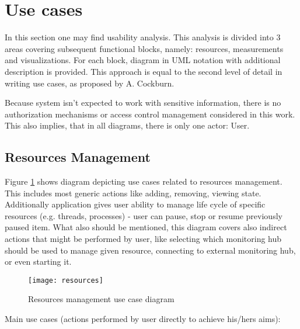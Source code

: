 %


\section{Use cases}
\label{sec:ch4_usecases}

In this section one may find usability analysis. This analysis is divided into 3 areas covering subsequent functional
blocks, namely: resources, measurements and visualizations. For each block, diagram in UML notation with additional
description is provided. This approach is equal to the second level of detail in writing use cases, as proposed by A.
Cockburn\cite{0201702258}. 

Because system isn't expected to work with sensitive information, there is no authorization mechanisms or access
control management considered in this work. This also implies, that in all diagrams, there is only one actor: User.

\pagebreak

\subsection{Resources Management}
\label{subsec:resources_mgmnt}

Figure \ref{fig:usecase_resources} shows diagram depicting use cases related to resources management. This includes most
generic actions like adding, removing, viewing state. Additionally application gives user ability to manage life cycle
of specific resources (e.g. threads, processes) - user can pause, stop or resume previously paused item. What also
should be mentioned, this diagram covers also indirect actions that might be performed by user, like selecting which
monitoring hub should be used to manage given resource, connecting to external monitoring hub, or even starting it.

\begin{figure}[ht]
  \centering
  \texttt{[image: resources]}
  \caption{Resources management use case diagram}
  \label{fig:usecase_resources}
\end{figure}

Main use cases (actions performed by user directly to achieve his/hers aims):

